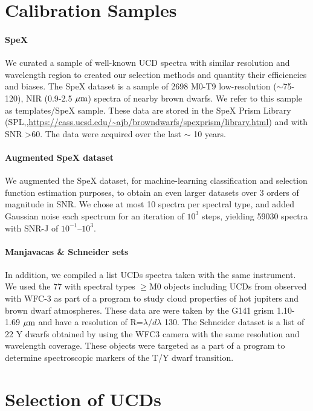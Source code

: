 \documentclass[manuscript]{aastex}
\begin{document}
\section{Calibration Samples}\label{trainset}


\paragraph{SpeX}
We curated a sample of well-known UCD spectra with similar resolution and wavelength region to created our selection methods and quantity their efficiencies and biases. The SpeX dataset is a sample of 2698 M0-T9 low-resolution ($\sim$75-120), NIR (0.9-2.5 $\mbox{$\mu$m}$) spectra of nearby brown dwarfs. We refer to this sample as templates/SpeX sample. These data are stored in the SpeX Prism Library (SPL,\citealt{2014arXiv1406.4887B},\url{https://cass.ucsd.edu/~ajb/browndwarfs/spexprism/library.html}) and with SNR \textgreater60. The data were acquired over the last $\sim$ 10 years. 

\paragraph{Augmented SpeX dataset}
We augmented the SpeX dataset, for machine-learning classification and selection function estimation purposes, to obtain an even larger datasets over 3 orders of magnitude in SNR. We chose at most 10 spectra per spectral type, and added Gaussian noise each spectrum for an iteration of $10^3$ steps, yielding 59030 spectra with SNR-J of $10^{-1}$--$10^3$.

\paragraph{Manjavacas \& Schneider sets}
In addition, we compiled a list UCDs spectra taken with the same instrument. We used the 77 with spectral types $\geq$M0 objects including UCDs from \cite{Manjavacas2018} observed with  WFC-3 as part of a program to study cloud properties of hot jupiters and brown dwarf atmospheres. These data are were taken by the G141 grism 1.10-1.69 $\mbox{$\mu$m}$ and have a resolution of R=$\lambda / d\lambda$ 130. The Schneider dataset is a list of 22 Y dwarfs obtained by \cite{Schneider2015} using the WFC3 camera with the same resolution and wavelength coverage. These objects were targeted as a part of a program to determine spectroscopic markers of the T/Y dwarf transition. 

\section{Selection of UCDs}\label{sec:selectionp}
\end{document}
